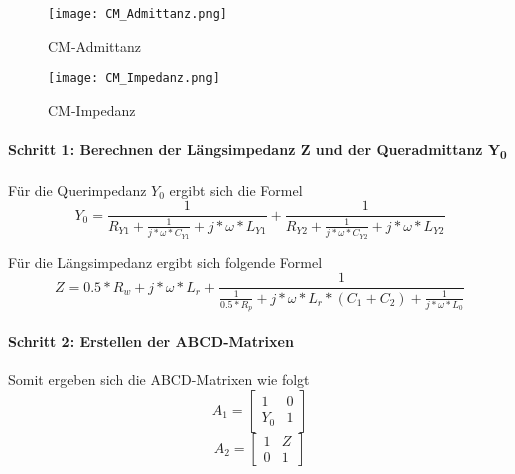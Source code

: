 \begin{figure}[H]
	\begin{minipage}[h]{0.45\linewidth}
		\centering
		\texttt{[image: CM\_Admittanz.png]}
		\label{fig:CM-Admittanz}
		\caption{CM-Admittanz \cite{aufgabenstellung}}
	\end{minipage}
	\hfill
	\begin{minipage}[h]{0.45\linewidth}
	\centering
		\texttt{[image: CM\_Impedanz.png]}
		\caption{CM-Impedanz \cite{aufgabenstellung}}
		\label{fig:CM-Impedanz}
	\end{minipage}
\end{figure}
\paragraph{Schritt 1: Berechnen der Längsimpedanz Z und der Queradmittanz Y\textsubscript{0}}\label{paragraph:schritt1}
Für die Querimpedanz $Y_0$ ergibt sich die Formel
\begin{equation}\label{y_admittance}
Y_0 = \frac{ 1 }{R_{Y1} + \frac{1}{j*\omega*C_{Y1}}+j*\omega*L_{Y1}} +\frac{ 1 }{R_{Y2} + \frac{1}{j*\omega*C_{Y2}}+j*\omega*L_{Y2}}
\end{equation}

Für die Längsimpedanz ergibt sich folgende Formel
\begin{equation}\label{z_impedance}
Z = 0.5*R_w+j*\omega*L_r+\frac{ 1 }{ \frac{1}{0.5*R_p}+j*\omega*L_r*(C_1+C_2)+\frac{1}{j*\omega*L_0} }
\end{equation}

\paragraph{Schritt 2: Erstellen der ABCD-Matrixen}\label{paragraph:schritt2}

Somit ergeben sich die ABCD-Matrixen wie folgt
\begin{equation}\label{equ:abcd_a1}
A_1 =
\left[\begin{matrix}
1 & 0\\ Y_0&1 
\end{matrix}\right]
\end{equation}
\begin{equation}\label{equ:abcd_a2}
A_2 =
\left[\begin{matrix}
1 & Z\\ 0&1 
\end{matrix}\right]
\end{equation}


